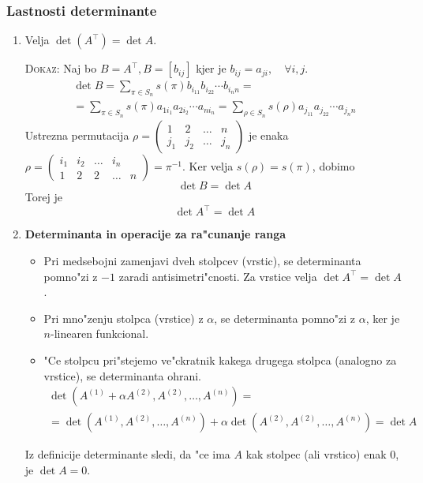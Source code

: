 \subsubsection{Lastnosti determinante}
\begin{enumerate}


	\item Velja $\det (A^\intercal)  = \det A$. 
	
	\textsc{Dokaz:} Naj bo $B = A^\intercal, B = [b_{ij}]$ kjer je $b_{ij} = a_{ji}, \quad \forall i, j$.
	\begin{gather*}
	\det B = \sum_{\pi \in S_n} s(\pi) b_{i_11} b_{i_22} \cdots b_{i_nn} = \\
	= \sum_{\pi \in S_n} s(\pi) a_{1i_1} a_{2i_2} \cdots a_{ni_n} = \sum _{\rho \in S_n} s(\rho) a_{j_11} a_{j_22} \cdots a_{j_nn}
	\end{gather*}
	Ustrezna permutacija $\rho = \begin{pmatrix}
	1 & 2 & \ldots &n \\
	j_1 & j_2 & \ldots &j_n
	\end{pmatrix}$ je enaka $\rho = \begin{pmatrix}
	i_1 & i_2 & \ldots & i_n \\
	1 & 2 & 2 & \ldots & n
	\end{pmatrix} = \pi^{-1}$. Ker velja $s(\rho) = s(\pi)$, dobimo
	\begin{equation*}
	\det B = \det A
	\end{equation*}
	Torej je
	\begin{equation*}
	\det A^\intercal = \det A
	\end{equation*}
	\item \textbf{Determinanta in operacije za ra"cunanje ranga}
	\begin{itemize}
		\item Pri medsebojni zamenjavi dveh stolpcev (vrstic), se determinanta pomno"zi z  $-1$ zaradi antisimetri"cnosti. Za vrstice velja $\det A^\intercal = \det A$.
	
		\item Pri mno"zenju stolpca (vrstice) z $\alpha$, se determinanta pomno"zi z $\alpha$, ker je $n$-linearen funkcional.
		
		\item "Ce stolpcu pri"stejemo ve"ckratnik kakega drugega stolpca (analogno za vrstice), se determinanta ohrani.
		\begin{gather*}
			\det(A^{(1)} + \alpha A^{(2)}, A^{(2)}, \ldots, A^{(n)}) = \\
			= \det(A^{(1)}, A^{(2)}, \ldots, A^{(n)}) + \alpha \det(A^{(2)}, A^{(2)}, \ldots, A^{(n)}) = \det A
		\end{gather*}
	\end{itemize}
	Iz definicije determinante sledi, da "ce ima $A$ kak stolpec (ali vrstico) enak 0, je $\det A = 0$.
	

\end{enumerate}
